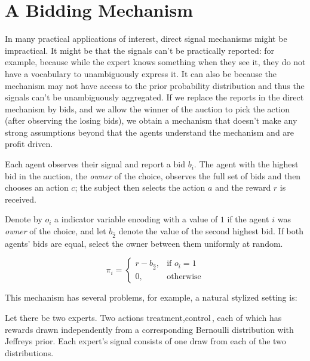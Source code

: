 


\section{A Bidding Mechanism}

In many practical applications of interest, direct signal mechanisms might be impractical. It might be that the signals can't be practically reported: for example, because while the expert knows something when they see it, they do not have a vocabulary to unambiguously express it. It can also be because the mechanism may not have access to the prior  probability distribution and thus the signals can't be unambiguously aggregated. 
If we replace the reports in the direct mechanism by bids, and we allow the winner of the auction to pick the action (after observing the losing bids), we obtain a mechanism that doesn't make any strong assumptions beyond that the agents understand the mechanism and are profit driven.



\begin{mech}

Each agent observes their signal and report a bid $b_i$.
The agent with the highest bid in the auction, the \emph{owner} of the choice, observes the full set of bids and then chooses an action $c$; the subject then selects the action $a$ and the reward $r$ is received. 

Denote by $o_{i}$ a indicator variable encoding with a value of $1$ if the agent $i$ was  \emph{owner} of the choice, and let $b_{\hat{2}}$ denote the value of the second highest  bid. If both agents' bids are equal, select the owner between them uniformly at random.

\[
    \pi_i =  
\begin{cases}
        r - b_{\hat{2}} ,& \text{if } o_{i} = 1 \\
		0,              & \text{otherwise}
\end{cases}
\]
\end{mech}


This mechanism has several problems, for example, a natural stylized setting is:


\begin{eg}\label{eg:two-iid-signals}
	Let there be two experts. Two actions ${\text{treatment},\text{control}}$, each of which has rewards drawn independently from a corresponding Bernoulli distribution with Jeffreys prior. Each expert's signal consists of one draw from each of the two distributions.
\end{eg}

